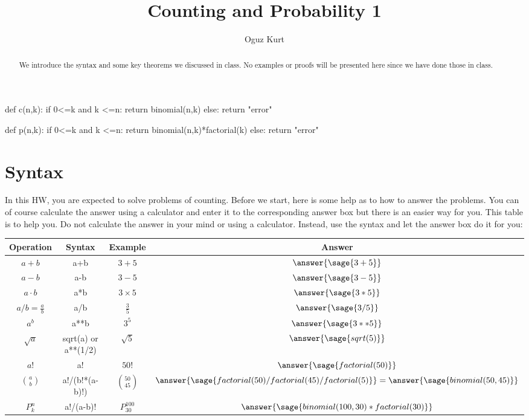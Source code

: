 \documentclass{ximera}
\title{Counting and Probability 1}
\author{Oguz Kurt}
\begin{document}
\begin{abstract}
We introduce the syntax and some key theorems we discussed in class. No examples or proofs will be presented here since we have done those in class.
\end{abstract}
\maketitle


\begin{sagesilent}
def c(n,k):
    if 0<=k and k <=n:
        return binomial(n,k)
    else:
        return "error"

def p(n,k):
    if 0<=k and k <=n:
        return binomial(n,k)*factorial(k)
    else:
        return "error"

\end{sagesilent}

\section*{Syntax}
In this HW, you are expected to solve problems of counting. Before we start, here is some help as to how to answer the problems. You can of course calculate the answer using a calculator and enter it to the corresponding answer box but there is an easier way for you. This table is to help you. Do not calculate the answer in your mind or using a calculator. Instead, use the syntax and let the answer box do it for you:

\hspace{0.5cm}

\begin{exercise}
\begin{tabular}{c|c|c|c}
Operation & Syntax & Example & Answer 
\\
\hline
$a+b$ & {\color{red} a+b} & $3+5$ & $\answer{\sage{3+5} }$
\\
\hline
$a- b$ & {\color{red} a-b} & $3-5$ & $\answer{\sage{3-5} }$
\\
\hline
$a\cdot b$ & {\color{red} a*b} & $3\times 5$ & $\answer{\sage{3*5} }$
\\
\hline
$a/b=\frac{a}{b}$ & {\color{red} a/b} & $\frac{3}{5}$ & $\answer{\sage{3/5} }$
\\
\hline
$a^b$ & {\color{red} a**b} & $3^5$ & $\answer{\sage{3**5} }$
\\
\hline
$\sqrt{a}$ & {\color{red} sqrt(a) or a**(1/2)} & $\sqrt{5}$ & $\answer{\sage{sqrt(5)} }$
\\
\hline
$a!$ & {\color{red} a!} & $50!$ & $\answer{\sage{factorial(50)} }$
\\
\hline
$\binom{a}{b}$ & {\color{red} a!/(b!*(a-b)!)} & $\binom{50}{45}$ & $\answer{\sage{factorial(50)/factorial(45)/factorial(5)}}=\answer{\sage{binomial(50,45)}}$ 
\\
\hline
$P_k^n$ & {\color{red} a!/(a-b)!} & $P_{30}^{100}$ & $\answer{\sage{binomial(100,30)*factorial(30)} }$ 
\\
\end{tabular}
\end{exercise}
\end{document}
